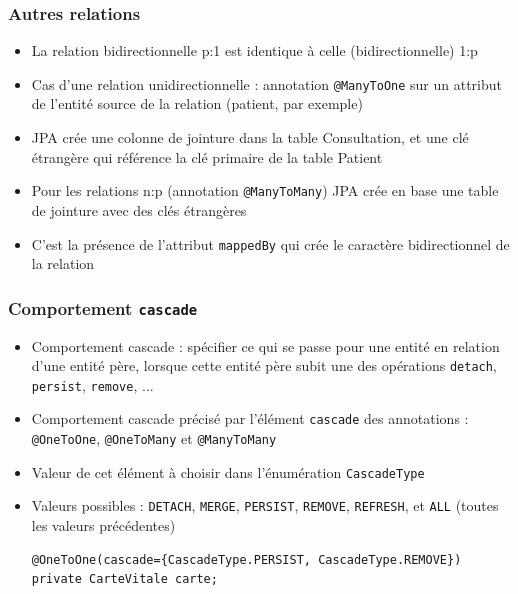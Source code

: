 \documentclass[aspectratio=169,10pt]{beamer}
\begin{document}
\begin{frame}
	\frametitle{Autres relations}
	
	\begin{itemize}
		\item La relation bidirectionnelle p:1 est identique à celle (bidirectionnelle) 1:p
		\item Cas d'une relation unidirectionnelle : annotation \texttt{@ManyToOne} sur un attribut de l'entité source de la relation (patient, par exemple)
		\item  JPA crée une colonne de jointure dans la table Consultation, et une clé étrangère qui référence la clé primaire de la table Patient
		\item Pour les relations n:p (annotation \texttt{@ManyToMany}) JPA crée en base une table de jointure avec des clés étrangères
		\item C'est la présence de l'attribut \texttt{mappedBy} qui crée le caractère bidirectionnel de la relation
	\end{itemize}
	
\end{frame}

\begin{frame}[fragile]
	\frametitle{Comportement \texttt{cascade}}
	
	\begin{itemize}
		\item Comportement cascade : spécifier ce qui se passe pour une entité en relation d'une entité père, lorsque cette entité père subit une des opérations \texttt{detach}, \texttt{persist}, \texttt{remove}, ...
		\item Comportement cascade précisé par l'élément \texttt{cascade} des annotations : \texttt{@OneToOne}, \texttt{@OneToMany} et \texttt{@ManyToMany}
		\item Valeur de cet élément à choisir dans l'énumération \texttt{CascadeType}
		\item Valeurs possibles : \texttt{DETACH}, \texttt{MERGE}, \texttt{PERSIST}, \texttt{REMOVE}, \texttt{REFRESH}, et \texttt{ALL} (toutes les valeurs précédentes)
\begin{lstlisting}
@OneToOne(cascade={CascadeType.PERSIST, CascadeType.REMOVE})
private CarteVitale carte;
\end{lstlisting}
	\end{itemize}
	
\end{frame}
\end{document}
